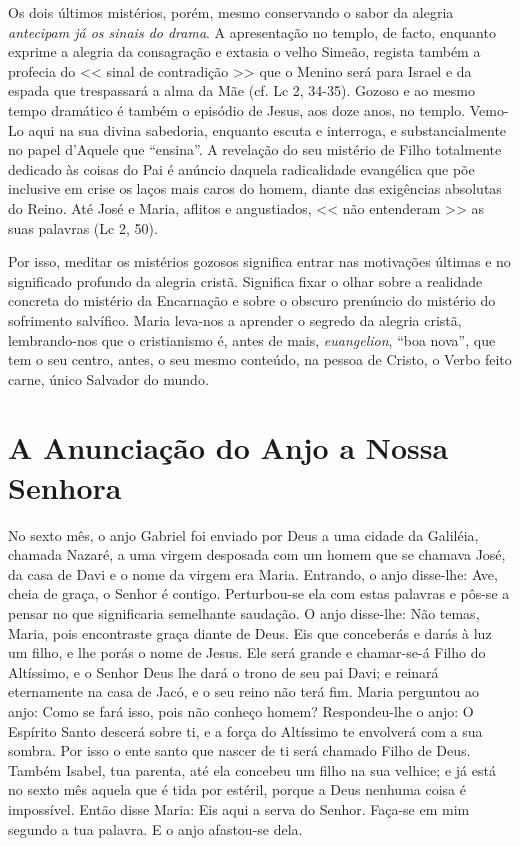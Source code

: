 \documentclass{rosario}
\begin{document}
Os dois últimos mistérios, porém, mesmo conservando o sabor da alegria \emph{antecipam já os sinais do drama}.
A apresentação no templo, de facto, enquanto exprime a alegria da consagração e extasia o velho Simeão, regista também a profecia do << sinal de contradição >> que o Menino será para Israel e da espada que trespassará a alma da Mãe (cf. Lc 2, 34-35).
Gozoso e ao mesmo tempo dramático é também o episódio de Jesus, aos doze anos, no templo.
Vemo-Lo aqui na sua divina sabedoria, enquanto escuta e interroga, e substancialmente no papel d'Aquele que ``ensina''.
A revelação do seu mistério de Filho totalmente dedicado às coisas do Pai é anúncio daquela radicalidade evangélica que põe inclusive em crise os laços mais caros do homem, diante das exigências absolutas do Reino.
Até José e Maria, aflitos e angustiados, << não entenderam >> as suas palavras (Lc 2, 50).

Por isso, meditar os mistérios gozosos significa entrar nas motivações últimas e no significado profundo da alegria cristã.
Significa fixar o olhar sobre a realidade concreta do mistério da Encarnação e sobre o obscuro prenúncio do mistério do sofrimento salvífico.
Maria leva-nos a aprender o segredo da alegria cristã, lembrando-nos que o cristianismo é, antes de mais, \emph{euangelion}, ``boa nova'', que tem o seu centro, antes, o seu mesmo conteúdo, na pessoa de Cristo, o Verbo feito carne, único Salvador do mundo.


\section{A Anunciação do Anjo a Nossa Senhora}




No sexto mês, o anjo Gabriel foi enviado por Deus a uma cidade da Galiléia, chamada Nazaré,
a uma virgem desposada com um homem que se chamava José, da casa de Davi e o nome da virgem era Maria.
Entrando, o anjo disse-lhe:
Ave, cheia de graça, o Senhor é contigo.
Perturbou-se ela com estas palavras e pôs-se a pensar no que significaria semelhante saudação.
O anjo disse-lhe:
Não temas, Maria, pois encontraste graça diante de Deus.
Eis que conceberás e darás à luz um filho, e lhe porás o nome de Jesus.
Ele será grande e chamar-se-á Filho do Altíssimo, e o Senhor Deus lhe dará o trono de seu pai Davi;
e reinará eternamente na casa de Jacó,
e o seu reino não terá fim.
Maria perguntou ao anjo:
Como se fará isso, pois não conheço homem?
Respondeu-lhe o anjo:
O Espírito Santo descerá sobre ti, e a força do Altíssimo te envolverá com a sua sombra.
Por isso o ente santo que nascer de ti será chamado Filho de Deus.
Também Isabel, tua parenta, até ela concebeu um filho na sua velhice;
e já está no sexto mês aquela que é tida por estéril,
porque a Deus nenhuma coisa é impossível.
Então disse Maria:
Eis aqui a serva do Senhor.
Faça-se em mim segundo a tua palavra.
E o anjo afastou-se dela.
\end{document}

